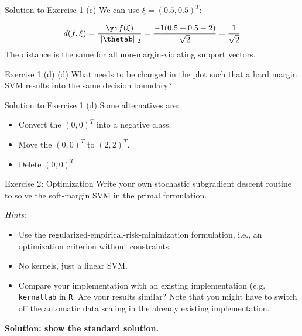 \documentclass[aspectratio=169]{beamer}
\begin{document}
\begin{frame}{Solution to Exercise 1 (c)}
	We can use $\xi = (0.5, 0.5)^T$:
	
	\begin{align*}
		d(f, \xi) = \frac{\yi f(\xi)}{||\thetab||_2} = \frac{-1 (0.5 + 0.5 - 2)}{\sqrt{2}} = \frac{1}{\sqrt{2}}
	\end{align*}
	The distance is the same for all non-margin-violating support vectors.
\end{frame}


\begin{frame}{Exercise 1 (d)}
	(d) What needs to be changed in the plot such that a hard margin SVM results into the same decision boundary?
\end{frame}

\begin{frame}{Solution to Exercise 1 (d)}
	Some alternatives are:
	\begin{itemize}
		\item<2-> Convert the $(0, 0)^T$ into a negative class.
		\item<3-> Move the $(0, 0)^T$ to $(2, 2)^T$.
		\item<4-> Delete $(0, 0)^T$.
	\end{itemize}
\end{frame}

\begin{frame}{Exercise 2: Optimization}
	Write your own stochastic subgradient descent routine to solve the soft-margin SVM in the primal formulation.
	
	\emph{Hints}:
	\begin{itemize}
		\item Use the regularized-empirical-risk-minimization formulation, i.e., an optimization criterion without constraints.
		\item No kernels, just a linear SVM.
		\item Compare your implementation with an existing implementation (e.g. \texttt{kernallab} in \texttt{R}. Are your results similar? Note that you might have to switch off the automatic data scaling in the already existing implementation.
	\end{itemize}
	
	\textbf{Solution: show the standard solution.}
\end{frame}
\end{document}
